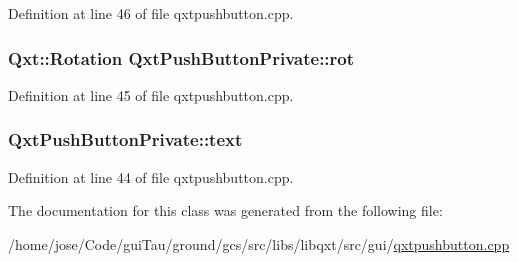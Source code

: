 Definition at line 46 of file qxtpushbutton.\-cpp.

\hypertarget{class_qxt_push_button_private_a374b849ddf2502372e0445f131fda0c9}{
\subsubsection[{rot}]{\setlength{\rightskip}{0pt plus 5cm}Qxt\-::\-Rotation Qxt\-Push\-Button\-Private\-::rot}}\label{class_qxt_push_button_private_a374b849ddf2502372e0445f131fda0c9}


Definition at line 45 of file qxtpushbutton.\-cpp.

\hypertarget{class_qxt_push_button_private_ad54b38931509049687f9ae090b8679ba}{
\subsubsection[{text}]{ Qxt\-Push\-Button\-Private\-::text}}\label{class_qxt_push_button_private_ad54b38931509049687f9ae090b8679ba}


Definition at line 44 of file qxtpushbutton.\-cpp.



The documentation for this class was generated from the following file\-:\begin{DoxyCompactItemize}
\item 
/home/jose/\-Code/gui\-Tau/ground/gcs/src/libs/libqxt/src/gui/\hyperlink{qxtpushbutton_8cpp}{qxtpushbutton.\-cpp}\end{DoxyCompactItemize}
